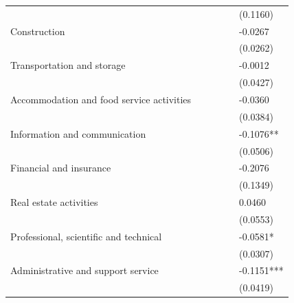 \begin{table}
\begin{center}
\begin{tabular}{llllll}
                                     &             &            &              &                 & (0.1160)          \\
Construction &             &            &              &                 & -0.0267           \\
                                     &             &            &              &                 & (0.0262)          \\
Transportation and storage &             &            &              &                 & -0.0012           \\
                                     &             &            &              &                 & (0.0427)          \\
Accommodation and food service activities &             &            &              &                 & -0.0360           \\
                                     &             &            &              &                 & (0.0384)          \\
Information and communication &             &            &              &                 & -0.1076**         \\
                                     &             &            &              &                 & (0.0506)          \\
Financial and insurance &             &            &              &                 & -0.2076           \\
                                     &             &            &              &                 & (0.1349)          \\
Real estate activities &             &            &              &                 & 0.0460            \\
                                     &             &            &              &                 & (0.0553)          \\
Professional, scientific and technical &             &            &              &                 & -0.0581*          \\
                                     &             &            &              &                 & (0.0307)          \\
Administrative and support service &             &            &              &                 & -0.1151***        \\
                                     &             &            &              &                 & (0.0419)          \\

\end{tabular}
\end{center}
\end{table}
